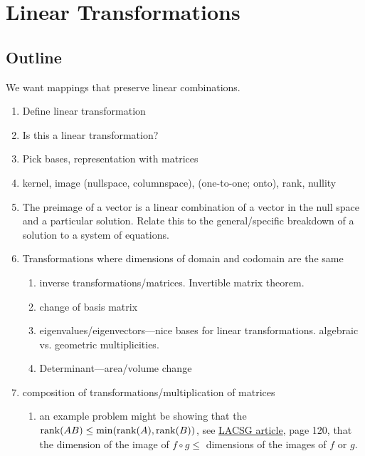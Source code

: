 \chapter{Linear Transformations}

\section{Outline}
We want mappings that preserve linear combinations.

\begin{enumerate}
\item Define linear transformation
\item Is this a linear transformation?
\item Pick bases, representation with matrices
\item kernel, image (nullspace, columnspace), (one-to-one; onto),
  rank, nullity
\item The preimage of a vector is a linear combination of a vector in
  the null space and a particular solution.  Relate this to the
  general/specific breakdown of a solution to a system of equations.
\item Transformations where dimensions of domain and codomain are the same
  \begin{enumerate}
  \item inverse transformations/matrices.  Invertible matrix theorem.
  \item change of basis matrix
  \item eigenvalues/eigenvectors---nice bases for linear
    transformations.  algebraic vs. geometric multiplicities.
  \item Determinant---area/volume change
  \end{enumerate}
\item composition of transformations/multiplication of matrices
  \begin{enumerate}
  \item an example problem might be showing that the $\operatorname{rank}(AB)\leq
    \min(\operatorname{rank}(A), \operatorname{rank}(B))$, see
    \href{http://www.math.ucsd.edu/~harel/Downloadable/The%20Linear%20Algebra%20Curriculum%20Study%20Group%20Recommendations%20-%20Moving%20Beyond%20Concept%20Definition.pdf}{LACSG article}, page 120, that the dimension of the image of $f\circ g \leq$ dimensions of the images of $f$ or $g$.
  \end{enumerate}
\end{enumerate}


